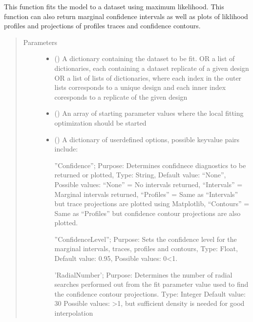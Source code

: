 \documentclass[letterpaper,10pt,english,openany,oneside]{sphinxmanual}
\begin{document}
\begin{fulllineitems}
\begin{fulllineitems}
This function fits the model to a dataset using maximum likelihood. This function can also
return marginal confidence intervals as well as plots of liklihood profiles and projections
of profiles traces and confidence contours.
\begin{quote}\begin{description}
\item[{Parameters}] \leavevmode\begin{itemize}
\item {} 
 (\sphinxstyleliteralemphasis{\sphinxupquote{, }}) \textendash{} A dictionary containing the dataset to be fit.
OR a list of dictionaries, each containing a dataset replicate of a given design
OR a list of lists of dictionaries, where each index in the outer lists corresponds
to a unique design and each inner index coresponds to a replicate of the given design

\item {} 
 (\sphinxstyleliteralemphasis{\sphinxupquote{, }}) \textendash{} An array of starting parameter values where the
local fitting optimization should be started

\item {} 
 (\sphinxstyleliteralemphasis{\sphinxupquote{, }}) \textendash{} 
A dictionary of user\sphinxhyphen{}defined options, possible key\sphinxhyphen{}value pairs
include:

”Confidence”;
Purpose: Determines confidnece diagnostics to be returned or plotted,
Type: String,
Default value: “None”,
Possible values:
“None” = No intervals returned,
“Intervals” = Marginal intervals returned,
“Profiles” = Same as “Intervals” but trace projections are plotted using Matplotlib,
“Contours” = Same as  “Profiles” but confidence contour projections are also plotted.

”ConfidenceLevel”;
Purpose: Sets the confidence level for the marginal intervals, traces, profiles and contours,
Type: Float,
Default value: 0.95,
Possible values: 0\textless{}1.

’RadialNumber’;
Purpose: Determines the number of radial searches performed out from the fit
parameter value used to find the confidence contour projections.
Type: Integer
Default value: 30
Possible values: \textgreater{}1, but sufficient density is needed for good interpolation


\end{itemize}
\end{description}
\end{quote}
\end{fulllineitems}
\end{fulllineitems}
\end{document}
